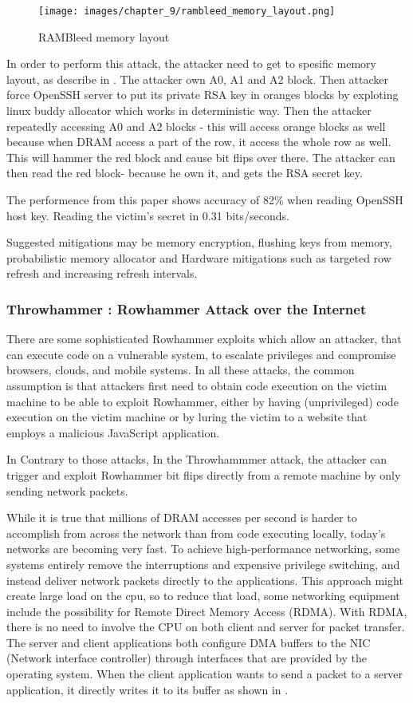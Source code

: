 \begin{figure}[!ht]
	\centering
	\texttt{[image: images/chapter\_9/rambleed\_memory\_layout.png]}
	\caption{RAMBleed memory layout}
	\label{fig:rambleed_memory_layout}
\end{figure}
In order to perform this attack, the attacker need to get to spesific memory layout, as describe in . The attacker own A0, A1 and A2 block. Then attacker force OpenSSH server to put its private RSA key in oranges blocks by exploting linux buddy allocator which works in deterministic way. Then the attacker repeatedly accessing A0 and A2 blocks - this will access orange blocks 
as well because when DRAM access a part of the row, it access the whole row as well. This will hammer the red block and cause bit flips over there. The attacker can then read the red block- because he own it, and gets the RSA secret key.

The performence from this paper shows accuracy of 82\% when reading OpenSSH host key. Reading the victim’s secret in 0.31 bits/seconds.

Suggested mitigations may be memory encryption, flushing keys from memory, probabilistic memory allocator and Hardware mitigations such as targeted row refresh and increasing refresh intervals.

\subsubsection{Throwhammer : Rowhammer Attack over the Internet ~\cite{throwhammer}}
There are some sophisticated Rowhammer exploits which allow an attacker, that can execute code on a vulnerable system, to escalate privileges and compromise browsers, clouds, and mobile systems. In all these attacks, the common assumption is that attackers first need to obtain code execution on the victim machine to be able to exploit Rowhammer, either by having (unprivileged) code execution on the victim machine or by luring the victim to a website that employs a malicious JavaScript application. 

In Contrary to those attacks, In the Throwhammmer attack, the attacker can trigger and exploit Rowhammer bit flips directly from a remote machine by only sending network packets.

While it is true that millions of DRAM accesses per second is harder to accomplish from across 
the network than from code executing locally, today’s networks are becoming very fast.
To achieve high-performance networking, some systems entirely remove the interruptions and
expensive privilege switching, and instead deliver network packets directly to the applications.
This approach might create large load on the cpu, so to reduce that load, some networking equipment include the possibility for Remote Direct Memory Access (RDMA).
With RDMA, there is no need to involve the CPU on both client and server for packet transfer. The server
and client applications both configure DMA buffers to the NIC (Network interface controller) through interfaces that are provided by the operating system. When the client application wants to send a packet to a server application, it directly writes it to its buffer as shown in .

